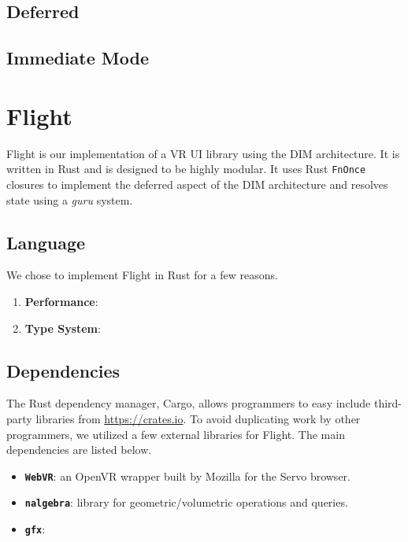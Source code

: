 \documentclass[conference,12pt]{IEEEtran}
\begin{document}
\subsection{Deferred}

\subsection{Immediate Mode}

\section{Flight}\label{sec:flight}
Flight is our implementation of a VR UI library using the DIM architecture. It
is written in Rust and is designed to be highly modular. It uses Rust
\texttt{FnOnce} closures to implement the deferred aspect of the DIM
architecture and resolves state using a \textit{guru} system.

\subsection{Language}
We chose to implement Flight in Rust for a few reasons.
\begin{enumerate}
    \item \textbf{Performance}: %
    \item \textbf{Type System}: %
\end{enumerate}

\subsection{Dependencies}
The Rust dependency manager, Cargo, allows programmers to easy include
third-party libraries from \url{https://crates.io}. To avoid duplicating work
by other programmers, we utilized a few external libraries for Flight. The main
dependencies are listed below.
\begin{itemize}
    \item \textbf{\texttt{WebVR}}: an OpenVR wrapper built by Mozilla for the
        Servo browser.
    \item \textbf{\texttt{nalgebra}}: library for geometric/volumetric
        operations and queries.
    \item \textbf{\texttt{gfx}}: %
\end{itemize}
\end{document}
